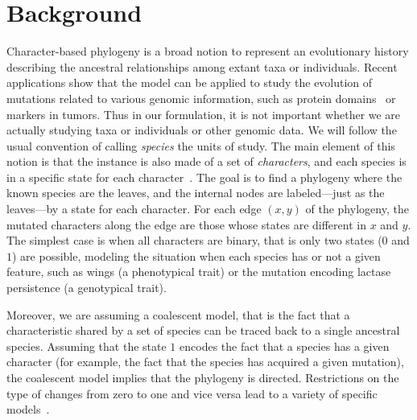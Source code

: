 \section*{Background}

Character-based phylogeny is a broad notion to represent an evolutionary history
describing the ancestral relationships among extant taxa or individuals. Recent applications show that
the model can be applied to study the evolution of mutations related to various genomic information, such as protein domains~\cite{Pr1} or markers in tumors.
Thus in  our formulation, it is not important whether we are actually studying taxa or
individuals or other genomic data.
We will follow the usual convention of calling
\emph{species} the units of study.
The main element of this notion is that the instance is also made of
a set of \emph{characters}, and each species is in a specific state for each character~\cite{Gusfield}.
The goal is to find a phylogeny where the known species are the leaves, and the
internal nodes are labeled---just as the leaves---by a state for each character.
For each edge $(x,y)$ of the phylogeny, the mutated characters along the edge are those whose
states are different in $x$ and $y$. The simplest case is when all characters are binary, that is only two states
($0$ and $1$) are possible,
modeling the situation  when each species has or not a given feature, such as
wings (a phenotypical trait) or the mutation encoding lactase persistence (a
genotypical trait).

Moreover, we are assuming a coalescent model, that is the fact that a characteristic
shared by a set of species can be traced back to a single ancestral species.
Assuming that the state $1$ encodes the fact that a species has a given
character (for example, the fact that the species has acquired a given mutation), the coalescent
model implies that the phylogeny is directed.
Restrictions on the type of changes from zero to one and vice versa lead to a variety of specific models~\cite{felsenstein:inferring-phylogenies}.




